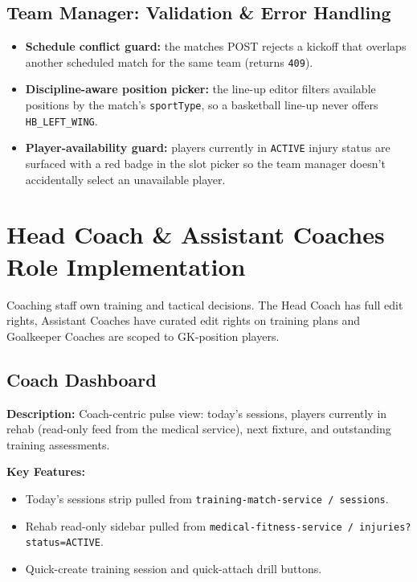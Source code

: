 \documentclass[12pt,a4paper,oneside]{report}
\begin{document}
\subsection*{Team Manager: Validation \& Error Handling}
\begin{itemize}[leftmargin=*]
  \item \textbf{Schedule conflict guard:} the matches POST rejects a
        kickoff that overlaps another scheduled match for the same
        team (returns \texttt{409}).
  \item \textbf{Discipline-aware position picker:} the line-up
        editor filters available positions by the match's
        \texttt{sportType}, so a basketball line-up never offers
        \texttt{HB\_LEFT\_WING}.
  \item \textbf{Player-availability guard:} players currently in
        \texttt{ACTIVE} injury status are surfaced with a red badge
        in the slot picker so the team manager doesn't accidentally
        select an unavailable player.
\end{itemize}

\section{Head Coach \& Assistant Coaches Role Implementation}
\label{sec:impl-coaches}

Coaching staff own training and tactical decisions. The Head Coach has
full edit rights, Assistant Coaches have curated edit rights on
training plans and Goalkeeper Coaches are scoped to GK-position
players.

\subsection*{Coach Dashboard}

\textbf{Description:} Coach-centric pulse view: today's sessions,
players currently in rehab (read-only feed from the medical service),
next fixture, and outstanding training assessments.

\textbf{Key Features:}
\begin{itemize}[leftmargin=*]
  \item Today's sessions strip pulled from
        \texttt{training-match-service / sessions}.
  \item Rehab read-only sidebar pulled from
        \texttt{medical-fitness-service / injuries?status=ACTIVE}.
  \item Quick-create training session and quick-attach drill
        buttons.
\end{itemize}
\end{document}

